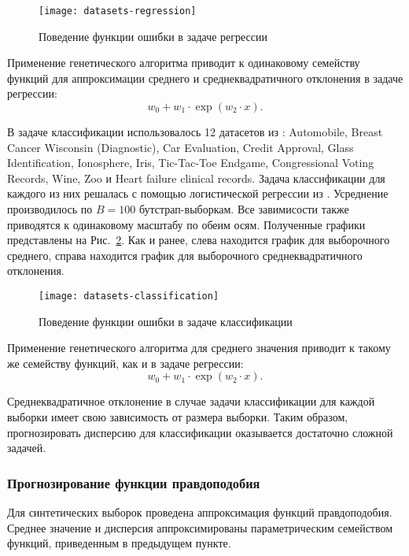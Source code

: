 \begin{figure}[h!]
    \centering
    \texttt{[image: datasets-regression]}
    \caption{Поведение функции ошибки в задаче регрессии}
    \label{datasets-regression}
\end{figure}

Применение генетического алгоритма приводит к одинаковому семейству функций для аппроксимации среднего и среднеквадратичного отклонения в задаче регрессии:
\[ w_0 + w_1 \cdot \exp(w_2 \cdot x). \]

В задаче классификации использовалось 12 датасетов из \citep{UCI}: Automobile, Breast Cancer Wisconsin (Diagnostic), Car Evaluation, Credit Approval, Glass Identification, Ionosphere, Iris, Tic-Tac-Toe Endgame, Congressional Voting Records, Wine, Zoo и Heart failure clinical records. Задача классификации для каждого из них решалась с помощью логистической регрессии из \citep{scikit-learn}. Усреднение производилось по $B = 100$ бутстрап-выборкам. Все завимисости также приводятся к одинаковому масштабу по обеим осям. Полученные графики представлены на Рис.~\ref{datasets-classification}. Как и ранее, слева находится график для выборочного среднего, справа находится график для выборочного среднеквадратичного отклонения.

\begin{figure}[h!]
    \centering
    \texttt{[image: datasets-classification]}
    \caption{Поведение функции ошибки в задаче классификации}
    \label{datasets-classification}
\end{figure}

Применение генетического алгоритма для среднего значения приводит к такому же семейству функций, как и в задаче регрессии:
\[ w_0 + w_1 \cdot \exp(w_2 \cdot x). \]

Среднеквадратичное отклонение в случае задачи классификации для каждой выборки имеет свою зависимость от размера выборки. Таким образом, прогнозировать дисперсию для классификации оказывается достаточно сложной задачей.

\subsubsection{Прогнозирование функции правдоподобия}

Для синтетических выборок проведена аппроксимация функций правдоподобия. Среднее значение и дисперсия аппроксимированы параметрическим семейством функций, приведенным в предыдущем пункте.

